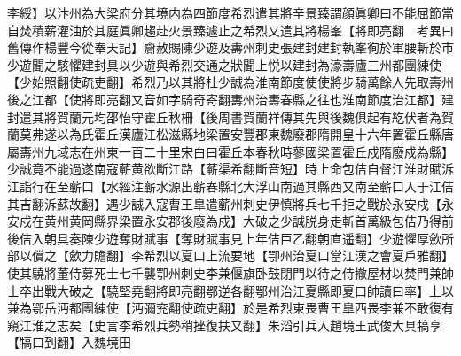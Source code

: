 李綬】以汴州為大梁府分其境内為四節度希烈遣其將辛景臻謂顔眞卿曰不能屈節當自焚積薪灌油於其庭眞卿趨赴火景臻遽止之希烈又遣其將楊峯【將即亮翻　考異曰舊傳作楊豐今從奉天記】齎赦賜陳少遊及夀州刺史張建封建封執峯徇於軍腰斬於市少遊聞之駭懼建封具以少遊與希烈交通之狀聞上悦以建封為濠壽廬三州都團練使【少始照翻使疏吏翻】希烈乃以其將杜少誠為淮南節度使使將步騎萬餘人先取壽州後之江都【使將即亮翻又音如字騎奇寄翻夀州治夀春縣之往也淮南節度治江都】建封遣其將賀蘭元均邵怡守霍丘秋柵【後周書賀蘭祥傳其先與後魏俱起有紇伏者為賀蘭莫弗遂以為氏霍丘漢廬江松滋縣地梁置安豐郡東魏廢郡隋開皇十六年置霍丘縣唐屬夀州九域志在州東一百二十里宋白曰霍丘本春秋時蓼國梁置霍丘戍隋廢戍為縣】少誠竟不能過遂南寇蘄黄欲斷江路【蘄渠希翻斷音短】時上命包佶自督江淮財賦泝江詣行在至蘄口【水經注蘄水源出蘄春縣北大浮山南過其縣西又南至蘄口入于江佶其吉翻泝蘇故翻】遇少誠入寇曹王臯遣蘄州刺史伊慎將兵七千拒之戰於永安戍【永安戍在黄州黄岡縣界梁置永安郡後廢為戍】大破之少誠脱身走斬首萬級包佶乃得前後佶入朝具奏陳少遊奪財賦事【奪財賦事見上年佶巨乙翻朝直遥翻】少遊懼厚歛所部以償之【歛力贍翻】李希烈以夏口上流要地【卾州治夏口當江漢之會夏戶雅翻】使其驍將董侍募死士七千襲卾州刺史李兼偃旗卧鼓閉門以待之侍撤屋材以焚門兼帥士卒出戰大破之【驍堅堯翻將即亮翻鄂逆各翻鄂州治江夏縣即夏口帥讀曰率】上以兼為鄂岳沔都團練使【沔彌兖翻使疏吏翻】於是希烈東畏曹王臯西畏李兼不敢復有窺江淮之志矣【史言李希烈兵勢稍挫復扶又翻】朱滔引兵入趙境王武俊大具犒享【犒口到翻】入魏境田

